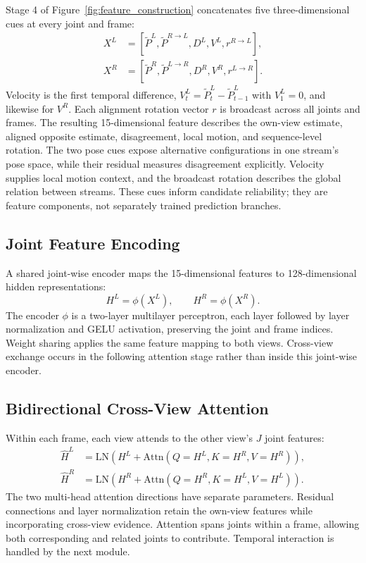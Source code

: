 \documentclass[preprint,12pt]{elsarticle}
\begin{document}
Stage 4 of Figure~\ref{fig:feature_construction} concatenates five three-dimensional cues at every joint and frame:
\[
\begin{aligned}
X^{L}&=[\tilde{P}^{L},\tilde{P}^{R \rightarrow L},D^{L},V^{L},r^{R \rightarrow L}],\\
X^{R}&=[\tilde{P}^{R},\tilde{P}^{L \rightarrow R},D^{R},V^{R},r^{L \rightarrow R}].
\end{aligned}
\]
Velocity is the first temporal difference, \(V^{L}_{t}=\tilde{P}^{L}_{t}-\tilde{P}^{L}_{t-1}\) with \(V^{L}_{1}=0\), and likewise for \(V^R\). Each alignment rotation vector \(r\) is broadcast across all joints and frames. The resulting 15-dimensional feature describes the own-view estimate, aligned opposite estimate, disagreement, local motion, and sequence-level rotation. The two pose cues expose alternative configurations in one stream's pose space, while their residual measures disagreement explicitly. Velocity supplies local motion context, and the broadcast rotation describes the global relation between streams. These cues inform candidate reliability; they are feature components, not separately trained prediction branches.

\subsection{Joint Feature Encoding}
\label{subsec:joint_feature_encoding}

A shared joint-wise encoder maps the 15-dimensional features to 128-dimensional hidden representations:
\[
H^{L} = \phi(X^{L}),\qquad H^{R} = \phi(X^{R}).
\]
The encoder \(\phi\) is a two-layer multilayer perceptron, each layer followed by layer normalization and GELU activation, preserving the joint and frame indices. Weight sharing applies the same feature mapping to both views. Cross-view exchange occurs in the following attention stage rather than inside this joint-wise encoder.

\subsection{Bidirectional Cross-View Attention}
\label{subsec:cross_view_attention}

Within each frame, each view attends to the other view's \(J\) joint features:
\[
\begin{aligned}
\hat{H}^{L}&=\mathrm{LN}\!\left(H^{L}+\mathrm{Attn}(Q=H^{L},K=H^{R},V=H^{R})\right),\\
\hat{H}^{R}&=\mathrm{LN}\!\left(H^{R}+\mathrm{Attn}(Q=H^{R},K=H^{L},V=H^{L})\right).
\end{aligned}
\]
The two multi-head attention directions have separate parameters. Residual connections and layer normalization retain the own-view features while incorporating cross-view evidence. Attention spans joints within a frame, allowing both corresponding and related joints to contribute. Temporal interaction is handled by the next module.
\end{document}
